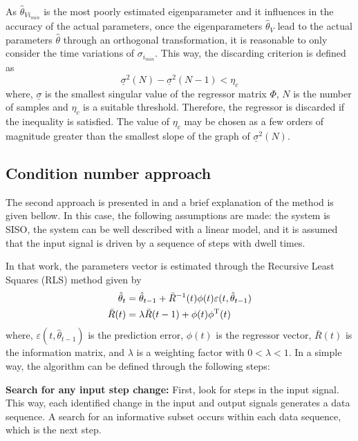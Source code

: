 As $\hat{\theta}_{Vi_{min}}$ is the most poorly estimated eigenparameter and it influences in the accuracy of the actual parameters, once the eigenparameters $\hat{\theta}_V$ lead to the actual parameters $\hat{\theta}$ through an orthogonal transformation, it is reasonable to only consider the time variations of $\sigma_{i_{min}}$.
This way, the discarding criterion is defined as
\begin{equation}
	\underline{\sigma}^2(N) - \underline{\sigma}^2(N-1) < \eta_c
\label{eq:smallest_sing_value}
\end{equation}
where, $\underline{\sigma}$ is the smallest singular value of the regressor matrix $\Phi$, $N$ is the number of samples and $\eta_c$ is a suitable threshold.
Therefore, the regressor is discarded if the inequality is satisfied.
The value of $\eta_c$ may be chosen as a few orders of magnitude greater than the smallest slope of the graph of $\underline{\sigma}^2(N)$.




\subsection{Condition number approach}
The second approach is presented in \cite{bittencourt2015algorithm} and a brief explanation of the method is given bellow.
In this case, the following assumptions are made: the system is SISO, the system can be well described with a linear model, and it is assumed that the input signal is driven by a sequence of steps with dwell times.


In that work, the parameters vector is estimated through the Recursive Least Squares (RLS) method given by
\begin{align*}
	\hat{\theta}_t &= \hat{\theta}_{t-1} + \bar{R}^{-1}(t)\phi(t)\varepsilon(t, \hat{\theta}_{t-1}) \\
	\bar{R}(t) &= \lambda\bar{R}(t-1) + \phi(t)\phi\tran(t) %
\end{align*}
where, $\varepsilon(t, \hat{\theta}_{t-1})$ is the prediction error, $\phi(t)$ is the regressor vector, $\bar{R}(t)$ is the information matrix, and $\lambda$ is a weighting factor with $0<\lambda<1$.
In a simple way, the algorithm can be defined through the following steps:

\textbf{Search for any input step change:} First, look for steps in the input signal.
This way, each identified change in the input and output signals generates a data sequence.
A search for an informative subset occurs within each data sequence, which is the next step.

